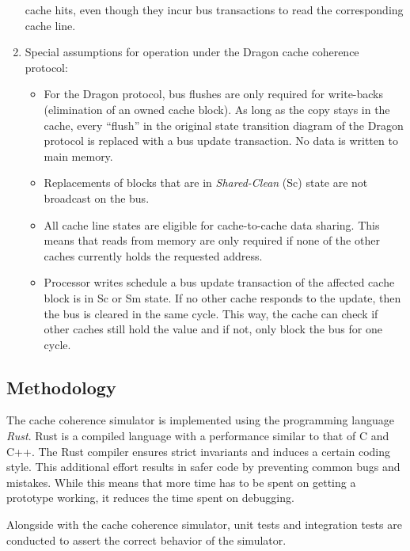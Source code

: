 \begin{enumerate}
          cache hits, even though they incur bus transactions to read the corresponding
          cache line.
    \item Special assumptions for operation under the Dragon cache coherence
          protocol:
          \begin{itemize}
              \item For the Dragon protocol, bus flushes are only required for write-backs
                    (elimination of an owned cache block). As long as the copy stays in the cache,
                    every ``flush'' in the original state transition diagram of the Dragon protocol
                    is replaced with a bus update transaction. No data is written to main memory.
              \item Replacements of blocks that are in \emph{Shared-Clean} (Sc) state are not
                    broadcast on the bus.
              \item All cache line states are eligible for cache-to-cache data sharing. This
                    means that reads from memory are only required if none of the other caches
                    currently holds the requested address.
              \item Processor writes schedule a bus update transaction of the affected cache
                    block is in Sc or Sm state. If no other cache responds to the update, then the
                    bus is cleared in the same cycle. This way, the cache can check if other caches
                    still hold the value and if not, only block the bus for one cycle.
          \end{itemize}

\end{enumerate}
\subsection{Methodology}
The cache coherence simulator is implemented using the programming language
\emph{Rust}. Rust is a compiled language with a performance similar to that of
C and C++. The Rust compiler ensures strict invariants and induces a certain
coding style. This additional effort results in safer code by preventing common
bugs and mistakes. While this means that more time has to be spent on getting a
prototype working, it reduces the time spent on debugging.

Alongside with the cache coherence simulator, unit tests and integration tests
are conducted to assert the correct behavior of the simulator.
